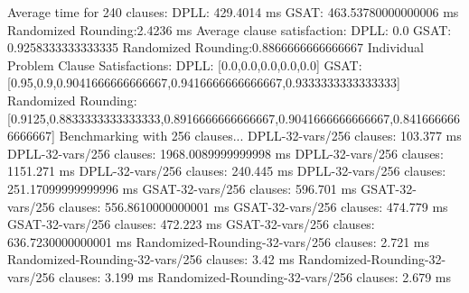 \documentclass{article}
\begin{document}
Average time for 240 clauses:\newline
  DPLL:               429.4014 ms\newline
  GSAT:               463.53780000000006 ms\newline
  Randomized Rounding:2.4236 ms\newline
Average clause satisfaction:\newline
  DPLL:               0.0\newline
  GSAT:               0.9258333333333335\newline
  Randomized Rounding:0.8866666666666667\newline
\newline
Individual Problem Clause Satisfactions:\newline
  DPLL:               [0.0,0.0,0.0,0.0,0.0]\newline
  GSAT:               [0.95,0.9,0.9041666666666667,0.9416666666666667,0.9333333333333333]\newline
  Randomized Rounding:[0.9125,0.8833333333333333,0.8916666666666667,0.9041666666666667,0.8416666666666667]\newline
\newline
\newline
Benchmarking with 256 clauses...\newline
DPLL-32-vars/256 clauses: 103.377 ms\newline
DPLL-32-vars/256 clauses: 1968.0089999999998 ms\newline
DPLL-32-vars/256 clauses: 1151.271 ms\newline
DPLL-32-vars/256 clauses: 240.445 ms\newline
DPLL-32-vars/256 clauses: 251.17099999999996 ms\newline
GSAT-32-vars/256 clauses: 596.701 ms\newline
GSAT-32-vars/256 clauses: 556.8610000000001 ms\newline
GSAT-32-vars/256 clauses: 474.779 ms\newline
GSAT-32-vars/256 clauses: 472.223 ms\newline
GSAT-32-vars/256 clauses: 636.7230000000001 ms\newline
Randomized-Rounding-32-vars/256 clauses: 2.721 ms\newline
Randomized-Rounding-32-vars/256 clauses: 3.42 ms\newline
Randomized-Rounding-32-vars/256 clauses: 3.199 ms\newline
Randomized-Rounding-32-vars/256 clauses: 2.679 ms\newline
\end{document}

